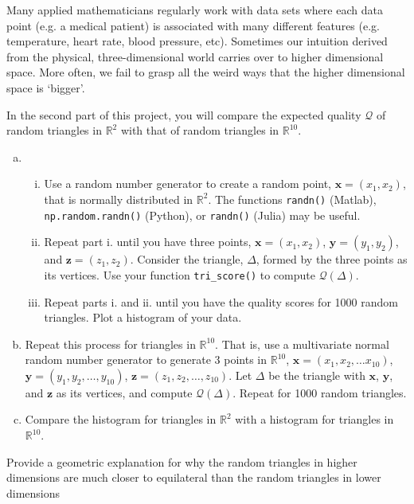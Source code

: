Many applied mathematicians regularly work with data sets where each data point (e.g. a medical patient) is associated with many different features (e.g. temperature, heart rate, blood pressure, etc). Sometimes our intuition derived from the physical, three-dimensional world carries over to higher dimensional space. More often, we fail to grasp all the weird ways that the higher dimensional space is `bigger'. 

In the second part of this project, you will compare the expected quality $\mathcal{Q}$ of random triangles in $\mathbb{R}^2$ with that of random triangles in $\mathbb{R}^{10}$.
\begin{enumerate}[(a)]
  \item 
  \begin{enumerate}[i.]
    \item Use a random number generator to create a random point, \(\bm{x} = (x_1,x_2)\), that is normally distributed in $\mathbb{R}^2$. The functions \texttt{randn()} (Matlab), \texttt{np.random.randn()} (Python), or \texttt{randn()} (Julia) may be useful.
    \item Repeat part i. until you have three points, $\bm{x} = (x_1,x_2)$, \(\bm{y} = (y_1,y_2)\), and \(\bm{z} = (z_1,z_2)\). Consider the triangle, $\Delta$, formed by the three points as its vertices. Use your function \texttt{tri\_score()} to compute $\mathcal{Q}(\Delta)$.
    \item Repeat parts i. and ii. until you have the quality scores for 1000 random triangles. Plot a histogram of your data.
  \end{enumerate}
  \item Repeat this process for triangles in $\mathbb{R}^{10}$. That is, use a multivariate normal random number generator to generate 3 points in $\mathbb{R}^{10}$, $\bm{x} = (x_1,x_2,\dots x_{10})$, $\bm{y} = (y_1,y_2,\dots,y_{10})$, $\bm{z} = (z_1,z_2, \dots, z_{10})$. Let $\Delta$ be the triangle with $\bm{x}$, $\bm{y}$, and $\bm{z}$ as its vertices, and compute $\mathcal{Q}(\Delta)$. Repeat for 1000 random triangles.
 \item Compare the histogram for triangles in $\mathbb{R}^2$ with a histogram for triangles in $\mathbb{R}^{10}$. 
\end{enumerate}
Provide a geometric explanation for why the random triangles in higher dimensions are much closer to equilateral than the random triangles in lower dimensions
